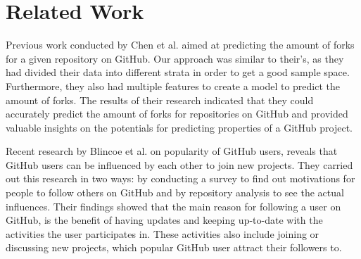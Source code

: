 \section{Related Work}
Previous work conducted by Chen et al.\cite{chen-2014} aimed at predicting the amount of forks for a given repository on GitHub.
Our approach was similar to their's, as they had divided their data into different strata in order to get a good sample space.
Furthermore, they also had multiple features to create a model to predict the amount of forks.
The results of their research indicated that they could accurately predict the amount of forks for repositories on GitHub and provided valuable insights on the potentials for predicting properties of a GitHub project.

Recent research by Blincoe et al.\cite{blincoe-2015} on popularity of GitHub users, reveals that GitHub users can be influenced by each other to join new projects.
They carried out this research in two ways: by conducting a survey to find out motivations for people to follow others on GitHub and by repository analysis to see the actual influences.
Their findings showed that the main reason for following a user on GitHub, is the benefit of having updates and keeping up-to-date with the activities the user participates in.
These activities also include joining or discussing new projects, which popular GitHub user attract their followers to.

 \\


